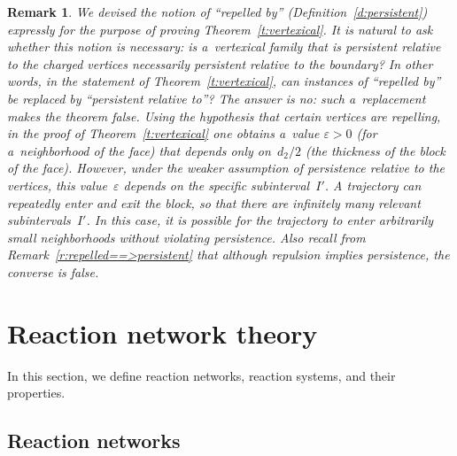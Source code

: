 \documentclass[pdftex]{sigma}
\newtheorem{Remark}[Theorem]{Remark}
\begin{document}
\begin{Remark}
\label{r:why_can't_replace_repelling_with_persistent}
We devised the notion of ``repelled by'' (Def\/inition~\ref{d:persistent}) expressly for the purpose of proving
Theorem~\ref{t:vertexical}.
It is natural to ask whether this notion is necessary: is a~vertexical family that is persistent relative to the
charged vertices necessarily persistent relative to the boundary? In other words, in the statement of
Theorem~\ref{t:vertexical}, can instances of ``repelled by'' be replaced by ``persistent relative to''? The answer is
no: such a~replacement makes the theorem false.
Using the hypothesis that certain vertices are repelling, in the proof of Theorem~\ref{t:vertexical} one obtains
a~value $\varepsilon>0$ (for a~neighborhood of the face) that depends only on~$d_2/2$ (the thickness of the block of
the face).
However, under the weaker assumption of persistence relative to the vertices, this value~$\varepsilon$ depends on the
specif\/ic subinterval~$I'$.
A trajectory can repeatedly enter and exit the block, so that there are inf\/initely many relevant subintervals~$I'$.
In this case, it is possible for the trajectory to enter arbitrarily small neighborhoods without violating persistence.
Also recall from Remark~\ref{r:repelled==>persistent} that although repulsion implies persistence, the converse is
false.
\end{Remark}

\section{Reaction network theory}
\label{sec:CRNT}

In this section, we def\/ine reaction networks, reaction systems, and their properties.

\subsection{Reaction networks}
\label{sub:networks}
\end{document}

